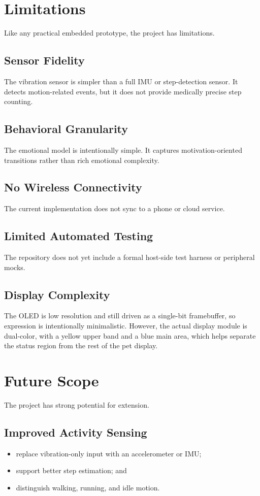 \documentclass[conference]{IEEEtran}
\begin{document}
\section{Limitations}
Like any practical embedded prototype, the project has limitations.

\subsection{Sensor Fidelity}
The vibration sensor is simpler than a full IMU or step-detection sensor. It detects motion-related events, but it does not provide medically precise step counting.

\subsection{Behavioral Granularity}
The emotional model is intentionally simple. It captures motivation-oriented transitions rather than rich emotional complexity.

\subsection{No Wireless Connectivity}
The current implementation does not sync to a phone or cloud service.

\subsection{Limited Automated Testing}
The repository does not yet include a formal host-side test harness or peripheral mocks.

\subsection{Display Complexity}
The OLED is low resolution and still driven as a single-bit framebuffer, so expression is intentionally minimalistic. However, the actual display module is dual-color, with a yellow upper band and a blue main area, which helps separate the status region from the rest of the pet display.

\section{Future Scope}
The project has strong potential for extension.

\subsection{Improved Activity Sensing}
\begin{itemize}
\item replace vibration-only input with an accelerometer or IMU;
\item support better step estimation; and
\item distinguish walking, running, and idle motion.
\end{itemize}
\end{document}
